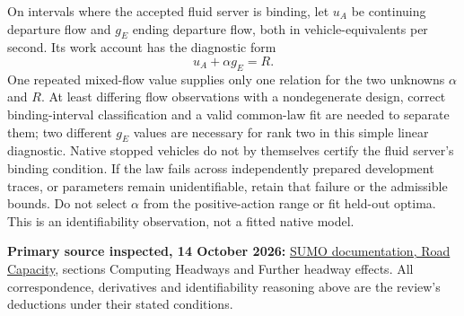 \documentclass[11pt,a4paper]{article}
\begin{document}
On intervals where the accepted fluid server is binding, let $u_A$ be
continuing departure flow and $g_E$ ending departure flow, both in
vehicle-equivalents per second. Its work account has the diagnostic form
\begin{equation}
 u_A+\alpha g_E=R.
\end{equation}
One repeated mixed-flow value supplies only one relation for the two
unknowns $\alpha$ and $R$. At least differing flow observations with a
nondegenerate design, correct binding-interval classification and a valid
common-law fit are needed to separate them; two different $g_E$ values are
necessary for rank two in this simple linear diagnostic. Native stopped
vehicles do not by themselves certify the fluid server's binding condition.
If the law fails across independently prepared development traces, or
parameters remain unidentifiable, retain that failure or the admissible
bounds. Do not select $\alpha$ from the positive-action range or fit held-out
optima. This is an identifiability observation, not a fitted native model.

\textbf{Primary source inspected, 14 October 2026:}
\href{https://sumo.dlr.de/docs/Simulation/RoadCapacity.html}{SUMO documentation,
Road Capacity}, sections Computing Headways and Further headway effects.
All correspondence, derivatives and identifiability reasoning above are
the review's deductions under their stated conditions.
\end{document}
